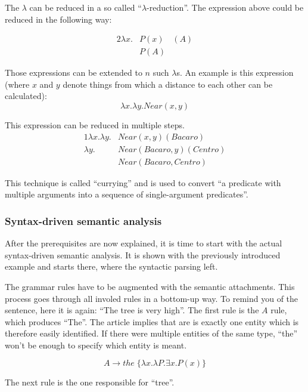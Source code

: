 \documentclass[12pt,twoside]{scrartcl}
\theoremstyle{plain}
\theoremstyle{definition}
\theoremstyle{remark}
\begin{document}
		The $\lambda$ can be reduced in a so called ``$\lambda$-reduction''\cite[p.~593]{Jurafsky2009a}. The expression above could be reduced in the following way:
		
		\begin{alignat*}{2}
			\lambda x.&P(x)&(A) \\
			&P(A)&
		\end{alignat*}
		
		Those expressions can be extended to $n$ such $\lambda$s. An example is this expression (where $x$ and $y$ denote things from which a distance to each other can be calculated):
		\[
			\lambda x.\lambda y.Near(x,y)
		\]
				
		This expression can be reduced in multiple steps.
		\begin{alignat*}{1}
			\lambda x.\lambda y.&Near(x,y)(Bacaro) \\
			\lambda y.&Near(Bacaro, y)(Centro) \\
			&Near(Bacaro, Centro)
		\end{alignat*}
				
		This technique is called ``currying''\cite[p.~594]{Jurafsky2009a} and is used to convert ``a predicate with multiple arguments into a sequence of single-argument predicates''\cite[p.~594]{Jurafsky2009a}.
		
		\subsubsection*{Syntax-driven semantic analysis}
		\label{subSubSec:syntaxDrivenSemanticAnalysis}
		
		After the prerequisites are now explained, it is time to start with the actual syntax-driven semantic analysis. It is shown with the previously introduced example and starts there, where the syntactic parsing left.
		
		The grammar rules have to be augmented with the semantic attachments. This process goes through all involed rules in a bottom-up way. To remind you of the sentence, here it is again: ``The tree is very high''. The first rule is the $A$ rule, which produces ``The''. The article implies that are is exactly one entity which is therefore easily identified. If there were multiple entities of the same type, ``the'' won't be enough to specify which entity is meant.
		
		\[
			A \rightarrow the \;\{\lambda x.\lambda P.\exists x.P(x)\}
		\]
		
		The next rule is the one responsible for ``tree''.
		
\end{document}
